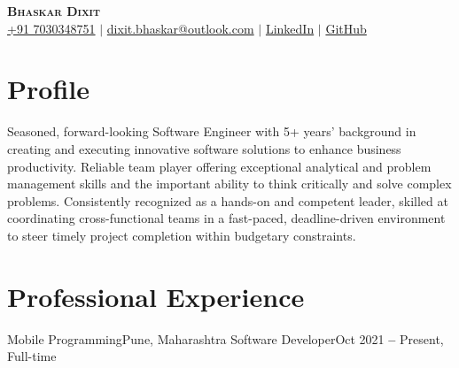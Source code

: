 \documentclass{resume}
\begin{document}

\begin{center}
    \textbf{\Huge \scshape Bhaskar Dixit} \\ \vspace{3pt}
    \small
    \faMobile \hspace{.5pt} \href{tel:917030348751}{+91 7030348751}
    $|$
    \faAt \hspace{.5pt} \href{mailto:dixit.bhaskar@outlook.com}{dixit.bhaskar@outlook.com}
    $|$
    \faLinkedinSquare \hspace{.5pt} \href{https://www.linkedin.com/in/bhaskar-dixit}{LinkedIn}
    $|$
    \faGithub \hspace{.5pt} \href{https://github.com/devBhaskar98}{GitHub}
\end{center}

\section{Profile}
{Seasoned, forward-looking Software Engineer with 5+ years' background in creating and executing innovative software solutions to enhance business productivity. Reliable team player offering exceptional analytical and problem management skills and the important ability to think critically and solve complex problems. Consistently recognized as a hands-on and competent leader, skilled at coordinating cross-functional teams in a fast-paced, deadline-driven environment to steer timely project completion within budgetary constraints.}

\section{Professional Experience}
\vspace{3pt}

\resumeSubHeadingListStart
\resumeSubheading
      {Mobile Programming}{Pune, Maharashtra}
      {Software Developer}{Oct 2021 \textbf{--} Present, Full-time}
\end{document}
